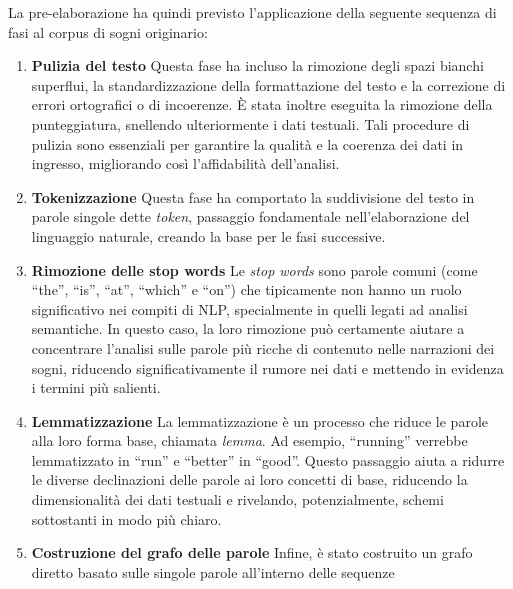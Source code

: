 La pre-elaborazione ha quindi previsto l'applicazione della seguente sequenza di fasi al corpus di sogni originario:
\begin{enumerate}
    \item \textbf{Pulizia del testo} \newline \noindent
          Questa fase ha incluso la rimozione degli spazi bianchi superflui, la standardizzazione della
          formattazione del testo e la correzione di errori ortografici o di incoerenze. È stata inoltre eseguita la
          rimozione della punteggiatura, snellendo ulteriormente i dati testuali. Tali procedure di pulizia sono
          essenziali per garantire la qualità e la coerenza dei dati in ingresso, migliorando così l'affidabilità
          dell'analisi.
    \item \textbf{Tokenizzazione} \newline \noindent
          Questa fase ha comportato la suddivisione del testo in parole singole dette \textit{token},
          passaggio fondamentale nell'elaborazione del linguaggio naturale, creando la base per le fasi successive.
    \item \textbf{Rimozione delle stop words} \newline \noindent
          Le \textit{stop words} sono parole comuni (come ``the'', ``is'', ``at'', ``which'' e ``on'') che tipicamente
          non hanno un ruolo significativo nei compiti di NLP, specialmente in quelli legati ad analisi semantiche.
          In questo caso, la loro rimozione può certamente aiutare a concentrare l'analisi sulle parole più ricche di
          contenuto nelle narrazioni dei sogni, riducendo significativamente il rumore nei dati e mettendo in evidenza
          i termini più salienti.
    \item \textbf{Lemmatizzazione} \newline \noindent
          La lemmatizzazione è un processo che riduce le parole alla loro forma base, chiamata \textit{lemma}.
          Ad esempio, ``running'' verrebbe lemmatizzato in ``run'' e ``better'' in ``good''.
          Questo passaggio aiuta a ridurre le diverse declinazioni delle parole ai loro concetti di base, riducendo
          la dimensionalità dei dati testuali e rivelando, potenzialmente, schemi sottostanti in modo più chiaro.
    \item \textbf{Costruzione del grafo delle parole} \newline \noindent
          Infine, è stato costruito un grafo diretto basato sulle singole parole all'interno delle sequenze

\end{enumerate}
